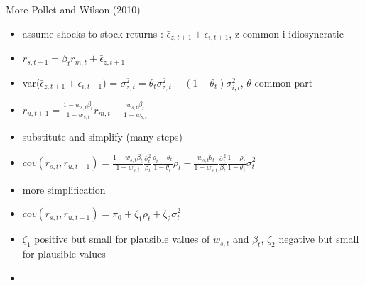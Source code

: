 \documentclass{beamer}
\newcommand{\backupend}{
	\setcounter{framenumber}{\value{finalframe}}
}
\begin{document}
\begin{frame}{More Pollet and Wilson (2010)}
	\begin{itemize}
		\item assume shocks to stock returns :  $\bar{\epsilon}_{z,t+1}+\epsilon_{i,t+1}$, z common i idiosyncratic
		\item $r_{s,t+1} = \beta_{t}r_{m,t} + \bar{\epsilon}_{z,t+1}$ 
		\item var($\bar{\epsilon}_{z,t+1}+\epsilon_{i,t+1}$) = $\sigma^{2}_{z,t} = \theta_{t}\sigma^{2}_{z,t} + (1-\theta_{t})\sigma^{2}_{i,t}$, $\theta$ common part
		\item $r_{u,t+1} = \frac{1-w_{s,t}\beta_{t}}{1-w_{s,t}}r_{m,t} - \frac{w_{s,t}\beta_{t}}{1-w_{s,t}}$
		\item substitute and simplify (many steps)
		\item $cov(r_{s,t},r_{u,t+1}) = \frac{1-w_{s,t}\beta_{t}}{1-w_{s,t}}\frac{\bar{\sigma}^{2}_{t}}{\beta_{t}}\frac{\bar{\rho}_{t}-\theta_{t}}{1-\theta_{t}}\bar{\rho_{t}} - \frac{w_{s,t}\theta_{t}}{1-w_{s,t}}\frac{\bar{\sigma}^{2}_{t}}{\beta_{t}}\frac{1-\bar{\rho}_{t}}{1-\theta_{t}}\bar{\sigma}^{2}_{t}$
		\item more simplification
		\item $cov(r_{s,t},r_{u,t+1}) = \pi_{0} + \zeta_{1}\bar{\rho_{t}} + \zeta_{2}\bar{\sigma}^{2}_{t}$
		\item $\zeta_{1}$ positive but small for plausible values of $w_{s,t}$ and $\beta_{t}$, $\zeta_{2}$ negative but small for plausible values
		\item \hyperlink{PWreturn}{}
	\end{itemize}
\end{frame}
\backupend
\end{document}

